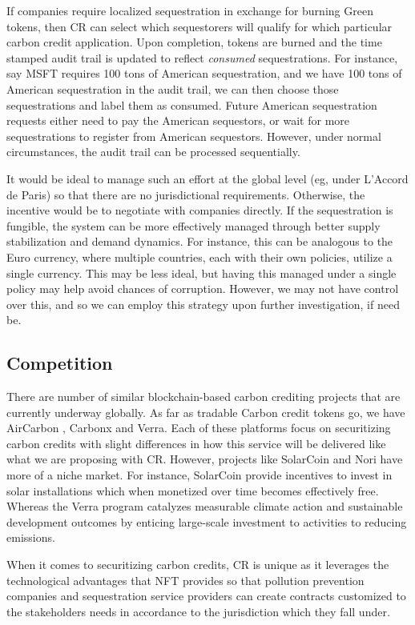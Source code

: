 \documentclass{article}
\begin{document}
If companies require localized sequestration in exchange for burning Green tokens, then CR can select which sequestorers will qualify for which particular carbon credit application. Upon completion, tokens are burned and the time stamped audit trail is updated to reflect \emph{consumed} sequestrations. For instance, say MSFT requires 100 tons of American sequestration, and we have 100 tons of American sequestration in the audit trail, we can then choose those sequestrations and label them as consumed. Future American sequestration requests either need to pay the American sequestors, or wait for more sequestrations to register from American sequestors. However, under normal circumstances, the audit trail can be processed sequentially.

It would be ideal to manage such an effort at the global level (eg, under L'Accord de Paris) so that there are no jurisdictional requirements. Otherwise, the incentive would be to negotiate with companies directly. If the sequestration is fungible, the system can be more effectively managed through better supply stabilization and demand dynamics. For instance, this can be analogous to the Euro currency, where multiple countries, each with their own policies, utilize a single currency. This may be less ideal, but having this managed under a single policy may help avoid chances of corruption. However, we may not have control over this, and so we can employ this strategy upon further investigation, if need be.

\subsection{Competition}

There are number of similar blockchain-based carbon crediting  projects that are currently underway globally. As far as tradable Carbon credit tokens go, we have AirCarbon \cite{AirCarbon}, Carbonx \cite{Carbonx} and Verra. Each of these platforms focus on securitizing carbon credits with slight differences in how this service will be delivered like what we are proposing with CR. However, projects like SolarCoin \cite{SolarCoin} and Nori \cite{Nori} have more of a niche market. For instance, SolarCoin provide incentives to invest in solar installations which when monetized over time becomes effectively free.  Whereas the Verra program catalyzes measurable climate action and sustainable development outcomes by enticing large-scale investment to activities to reducing emissions.

When it comes to securitizing carbon credits, CR is unique as it leverages the technological advantages that NFT provides so that pollution prevention companies and sequestration service providers can create contracts customized to the  stakeholders needs in accordance to the jurisdiction which they fall under.
\end{document}
